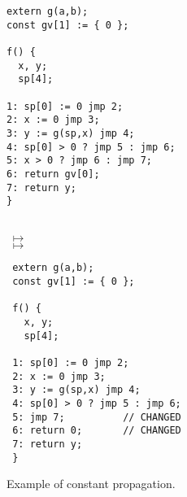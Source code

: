 
\begin{figure}
\noindent
\begin{minipage}{0.5\columnwidth}
\begin{verbatim}
extern g(a,b);
const gv[1] := { 0 };

f() {
  x, y;
  sp[4];

1: sp[0] := 0 jmp 2;
2: x := 0 jmp 3;
3: y := g(sp,x) jmp 4;
4: sp[0] > 0 ? jmp 5 : jmp 6;
5: x > 0 ? jmp 6 : jmp 7;
6: return gv[0];
7: return y;
}
\end{verbatim}
\end{minipage}
\begin{minipage}{0.05\columnwidth}
\mbox{}\\[4.55cm]
$\;\mapsto$\\[0.05cm]
$\;\mapsto$\\
\end{minipage}
\begin{minipage}{0.4\columnwidth}
\begin{verbatim}
 extern g(a,b);
 const gv[1] := { 0 };
 
 f() {
   x, y;
   sp[4];
 
 1: sp[0] := 0 jmp 2;
 2: x := 0 jmp 3;
 3: y := g(sp,x) jmp 4;
 4: sp[0] > 0 ? jmp 5 : jmp 6;
 5: jmp 7;          // CHANGED
 6: return 0;       // CHANGED
 7: return y;
 }
\end{verbatim}
\end{minipage}
\caption{Example of constant propagation.}
\label{fig:const-prop-example}
\end{figure}


